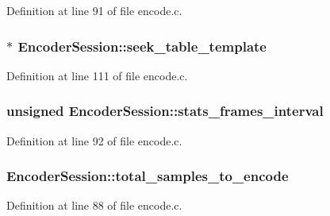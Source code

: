 Definition at line 91 of file encode.\+c.

\subsubsection[{\texorpdfstring{seek\+\_\+table\+\_\+template}{seek_table_template}}]{$\ast$ Encoder\+Session\+::seek\+\_\+table\+\_\+template}\hypertarget{struct_encoder_session_af7a7cdd54c9d40e45e5672f66847222e}{}\label{struct_encoder_session_af7a7cdd54c9d40e45e5672f66847222e}


Definition at line 111 of file encode.\+c.

\subsubsection[{\texorpdfstring{stats\+\_\+frames\+\_\+interval}{stats_frames_interval}}]{\setlength{\rightskip}{0pt plus 5cm}unsigned Encoder\+Session\+::stats\+\_\+frames\+\_\+interval}\hypertarget{struct_encoder_session_a578b43861ecda579c3ab2ca088c001fe}{}\label{struct_encoder_session_a578b43861ecda579c3ab2ca088c001fe}


Definition at line 92 of file encode.\+c.

\subsubsection[{\texorpdfstring{total\+\_\+samples\+\_\+to\+\_\+encode}{total_samples_to_encode}}]{ Encoder\+Session\+::total\+\_\+samples\+\_\+to\+\_\+encode}\hypertarget{struct_encoder_session_a0923962b8a6f2292c1afaa0a91bca47a}{}\label{struct_encoder_session_a0923962b8a6f2292c1afaa0a91bca47a}


Definition at line 88 of file encode.\+c.

